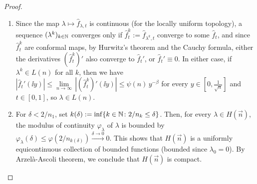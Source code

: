\documentclass[a4paper, 11pt]{article}
\theoremstyle{definition}
\numberwithin{equation}{section}
\numberwithin{figure}{section}
\begin{document}
\begin{proof}\ 
\begin{enumerate}[leftmargin=*, label=\textnormal{(\roman*)}]
\item Since the map $\lambda \mapsto \hat f_{\lambda, t}$ is continuous (for the locally uniform topology), 
a sequence $(\lambda^{k})_{k\in\mathbb{N}}$ converges only if $\hat f_t^{k} := \hat f_{\lambda^{k},t}$ converge to some $\hat f_t$, and since $\hat f_t^{k}$ are conformal maps, by Hurwitz's theorem and the Cauchy formula, 
either the derivatives $(\hat f_t^{k})'$ also converge to $\hat f_t'$, or $\hat f_t' \equiv 0$. 
In either case, if $\lambda^{k} \in L(n)$ for all $k$, then we have
$|\hat f_t'(\ii y)| \le \underset{n \to \infty}{\lim} \, |(\hat f^{k}_t)'(\ii y)| \le \psi(n) \, y^{-\beta}$ for every $y \in [0, \tfrac{1}{\sqrt{n}} ]$ and $t \in [0,1]$, so $\lambda \in L(n)$.

\item For $\delta < 2/n_1$, set $k(\delta) := \inf\{k\in\mathbb{N} \colon 2/n_k \le \delta\}$. 
Then, for every $\lambda \in H(\vec n)$, the modulus of continuity $\varphi_\lambda$ of $\lambda$ is bounded by $\varphi_\lambda(\delta) \le \varphi(2/n_{k(\delta)}) \xrightarrow{\delta \to 0} 0$. 
This shows that $H(\vec n)$ is a uniformly equicontinuous collection of bounded functions (bounded since $\lambda_0 = 0$). 
By Arzel\`a-Ascoli theorem, we conclude that $H(\vec n)$ is compact.


\end{enumerate}
\end{proof}
\end{document}
